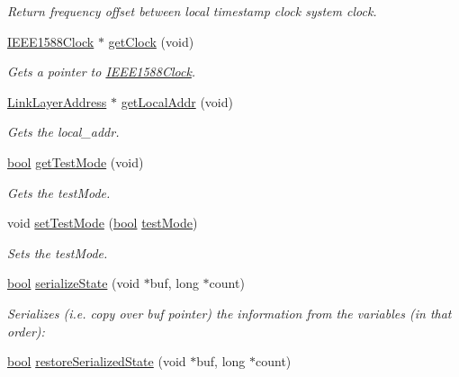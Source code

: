 \begin{DoxyCompactItemize}
\begin{DoxyCompactList}\small\item\em Return frequency offset between local timestamp clock system clock. \end{DoxyCompactList}\item 
\hyperlink{class_i_e_e_e1588_clock}{I\+E\+E\+E1588\+Clock} $\ast$ \hyperlink{class_common_port_ab8e59ecfb51ec14e166bc8bfc872b1ef}{get\+Clock} (void)
\begin{DoxyCompactList}\small\item\em Gets a pointer to \hyperlink{class_i_e_e_e1588_clock}{I\+E\+E\+E1588\+Clock}. \end{DoxyCompactList}\item 
\hyperlink{class_link_layer_address}{Link\+Layer\+Address} $\ast$ \hyperlink{class_common_port_ab6607250666be12220407c6c12671f65}{get\+Local\+Addr} (void)
\begin{DoxyCompactList}\small\item\em Gets the local\+\_\+addr. \end{DoxyCompactList}\item 
\hyperlink{avb__gptp_8h_af6a258d8f3ee5206d682d799316314b1}{bool} \hyperlink{class_common_port_a98f6d8a0054a05b8e627d3f9ffc53be3}{get\+Test\+Mode} (void)
\begin{DoxyCompactList}\small\item\em Gets the test\+Mode. \end{DoxyCompactList}\item 
void \hyperlink{class_common_port_af12e3bb99414e67bf569609f0a631d6c}{set\+Test\+Mode} (\hyperlink{avb__gptp_8h_af6a258d8f3ee5206d682d799316314b1}{bool} \hyperlink{class_common_port_a4ca1649b0fc050ca483e5dd8996ac80d}{test\+Mode})
\begin{DoxyCompactList}\small\item\em Sets the test\+Mode. \end{DoxyCompactList}\item 
\hyperlink{avb__gptp_8h_af6a258d8f3ee5206d682d799316314b1}{bool} \hyperlink{class_common_port_a7ae77a9c4cc2f66b95fe47a58b571113}{serialize\+State} (void $\ast$buf, long $\ast$count)
\begin{DoxyCompactList}\small\item\em Serializes (i.\+e. copy over buf pointer) the information from the variables (in that order)\+: \end{DoxyCompactList}\item 
\hyperlink{avb__gptp_8h_af6a258d8f3ee5206d682d799316314b1}{bool} \hyperlink{class_common_port_a383669aeae1b1eeaa021267a0041d163}{restore\+Serialized\+State} (void $\ast$buf, long $\ast$count)

\end{DoxyCompactItemize}
